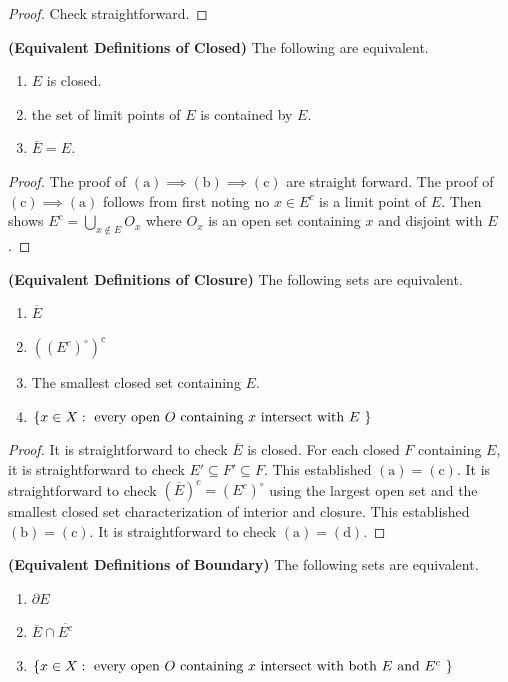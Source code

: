 \documentclass{report}
\begin{document}
\begin{proof}
Check straightforward.
\end{proof}
\begin{theorem}
\textbf{(Equivalent Definitions of Closed)} The following are equivalent.
\begin{enumerate}[label=(\alph*)]
  \item $E$ is closed.
  \item the set of limit points of $E$ is contained by $E$.
  \item $\overline{E}=E$.
\end{enumerate}
\end{theorem}
\begin{proof}
The proof of $(\text{a})\implies (\text{b})\implies (\text{c})$ are straight forward. The proof of $(\text{c})\implies (\text{a})$ follows from first noting no  $x\in E^c$ is a limit point of $E$. Then shows $E^c = \bigcup_{x \not \in E}O_x$ where $O_x$ is an open set containing $x$ and disjoint with $E$.
\end{proof}
\begin{theorem}
\textbf{(Equivalent Definitions of Closure)} The following sets are equivalent.
\begin{enumerate}[label=(\alph*)]
  \item $\overline{E}$
  \item $((E^c)^\circ )^c$ 
  \item The smallest closed set containing $E$.
  \item $\{ x\in X:\text{ every open $O$ containing $x$ intersect with $E$ } \}$
\end{enumerate}
\end{theorem}
\begin{proof}
It is straightforward to check $\overline{E}$ is closed. For each closed $F$ containing $E$, it is straightforward to check  $E'\subseteq F'\subseteq F$. This established $(\text{a})=(\text{c})$. It is straightforward to check $(\overline{E})^c=(E^c)^\circ $ using the largest open set and the smallest closed set characterization of interior and closure. This established $(\text{b})=(\text{c})$. It is straightforward to check $(\text{a})=(\text{d})$.
\end{proof}
\begin{theorem}
\textbf{(Equivalent Definitions of Boundary)} The following sets are equivalent.
\begin{enumerate}[label=(\alph*)]
  \item $\partial E$
  \item $\overline{E}\cap \overline{E^c}$
  \item $\{ x \in X:\text{ every open $O$ containing $x$ intersect with both $E$ and $E^c$ } \}$
\end{enumerate}
\end{theorem}
\end{document}
